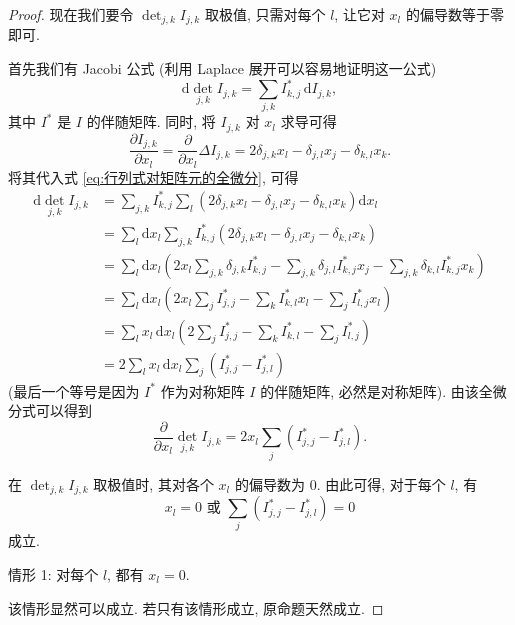 \documentclass{article}
\begin{document}
\begin{proof}
现在我们要令 $\det_{j,k}I_{j,k}$ 取极值,
只需对每个 $l$, 让它对 $x_l$ 的偏导数等于零即可.

首先我们有 Jacobi 公式 (利用 Laplace 展开可以容易地证明这一公式)
\begin{equation}
	\label{eq:行列式对矩阵元的全微分}
	\mathrm d\det_{j,k}I_{j,k}=\sum_{j,k}I^*_{k,j}\,\mathrm dI_{j,k},
\end{equation}
其中 $I^*$ 是 $I$ 的伴随矩阵.
同时, 将 $I_{j,k}$ 对 $x_l$ 求导可得
\begin{equation}
	\frac{\partial I_{j,k}}{\partial x_l}=\frac{\partial}{\partial x_l}\Delta I_{j,k}=
	2\delta_{j,k}x_l-\delta_{j,l}x_j-\delta_{k,l}x_k.
\end{equation}
将其代入式 \ref{eq:行列式对矩阵元的全微分}, 可得
\begin{equation}
\begin{split}
	\mathrm d\det_{j,k}I_{j,k}&=\sum_{j,k}I^*_{k,j}
	\sum_l\left(2\delta_{j,k}x_l-\delta_{j,l}x_j-\delta_{k,l}x_k\right)\mathrm dx_l\\
	&=\sum_l\mathrm dx_l\sum_{j,k}I^*_{k,j}\left(2\delta_{j,k}x_l-\delta_{j,l}x_j-\delta_{k,l}x_k\right)\\
	&=\sum_l\mathrm dx_l
	\left(2x_l\sum_{j,k}\delta_{j,k}I^*_{k,j}
	-\sum_{j,k}\delta_{j,l}I^*_{k,j}x_j
	-\sum_{j,k}\delta_{k,l}I^*_{k,j}x_k\right)\\
	&=\sum_l\mathrm dx_l\left(2x_l\sum_jI^*_{j,j}-\sum_kI^*_{k,l}x_l-\sum_jI^*_{l,j}x_l\right)\\
	&=\sum_lx_l\,\mathrm dx_l\left(2\sum_jI^*_{j,j}-\sum_kI^*_{k,l}-\sum_jI^*_{l,j}\right)\\
	&=2\sum_lx_l\,\mathrm dx_l\sum_j\left(I^*_{j,j}-I^*_{j,l}\right)
\end{split}
\end{equation}
(最后一个等号是因为 $I^*$ 作为对称矩阵 $I$ 的伴随矩阵, 必然是对称矩阵).
由该全微分式可以得到
\begin{equation}
	\frac{\partial}{\partial x_l}\det_{j,k}I_{j,k}=2x_l\sum_j\left(I^*_{j,j}-I^*_{j,l}\right).
\end{equation}

在 $\det_{j,k}I_{j,k}$ 取极值时, 其对各个 $x_l$ 的偏导数为 $0$.
由此可得, 对于每个 $l$, 有
\begin{equation}
	x_l=0\text{ 或 }\sum_j\left(I^*_{j,j}-I^*_{j,l}\right)=0
\end{equation}
成立.

情形 1: 对每个 $l$, 都有 $x_l=0$.

该情形显然可以成立.
若只有该情形成立, 原命题天然成立.


\end{proof}
\end{document}
